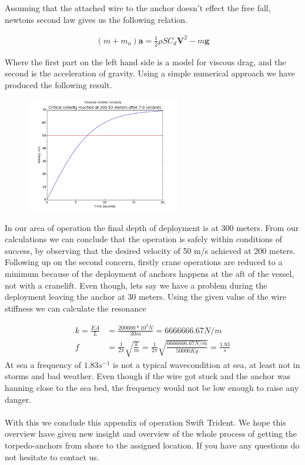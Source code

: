 \documentclass[a4paper,norsk]{article}
\begin{document}
 Assuming that the attached wire to the anchor doesn't effect the free fall, newtons second law gives us the following relation.

\begin{align}
(m+m_a)\textbf{a} = \frac{1}{2}\rho SC_d \textbf{V}^2 - m\textbf{g}
\end{align}

Where the first part on the left hand side is a model for viscous drag, and the second is the acceleration of gravity. Using a simple numerical approach we have produced the following result.
\newpage
\begin{figure}[h!]
\centering
\includegraphics[width=0.6\textwidth]{velocity.jpg}
\end{figure}
In our area of operation the final depth of deployment is at 300 meters. From our calculations we can conclude that the operation is safely within conditions of success, by observing that the desired velocity of 50 m/s achieved at 200 meters.
\\
Following up on the second concern, firstly crane operations are reduced to a minimum because of the deployment of anchors happens at the aft of the vessel, not with a cranelift. Even though, lets say we have a problem during the deployment leaving the anchor at 30 meters. Using the given value of the wire stiffness we can calculate the resonance

\begin{align}
k = \frac{EA}{L} &= \frac{200 000 *10^3 N}{30 m} = 6666666.67 N/m \\
f &= \frac{1}{2\pi} \sqrt{\frac{k}{m}} = \frac{1}{2\pi} \sqrt{\frac{6666666.67 N/m}{50000 Kg}} = \frac{1.83}{s}
\end{align}
At sea a frequency of $1.83s^{-1}$ is not a typical wavecondition at sea, at least not in storms and bad weather. Even though if the wire got stuck and the anchor was hanning close to the sea bed, the frequency would not be low enough to raise any danger.
\\ \\
With this we conclude this appendix of operation Swift Trident. We hope this overview have given new insight and overview of the whole process of getting the torpedo-anchors from shore to the assigned location. If you have any questions do not hesitate to contact us.
\end{document}
